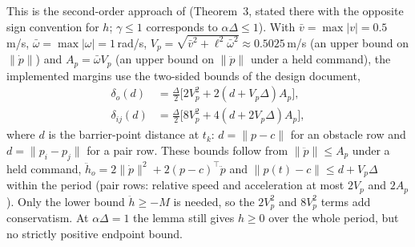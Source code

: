 \documentclass[journal]{IEEEtran}
\begin{document}
This is the second-order approach of \cite{breeden2022} (Theorem~3, stated there with the opposite
sign convention for $h$; $\gamma\le1$ corresponds to $\alpha\Delta\le1$). With
$\bar v=\max|v|=0.5$\,m/s, $\bar\omega=\max|\omega|=1$\,rad/s,
$V_p=\sqrt{\bar v^2+\ell^2\bar\omega^2}\approx0.5025$\,m/s (an upper bound on $\|\dot p\|$) and $A_p=\bar\omega V_p$ (an upper bound on $\|\ddot p\|$ under a held command), the implemented margins use the
two-sided bounds of the design document,
\begin{equation}
\begin{aligned}
\delta_o(d)&=\tfrac{\Delta}{2}\big[2V_p^2+2(d+V_p\Delta)A_p\big],\\
\delta_{ij}(d)&=\tfrac{\Delta}{2}\big[8V_p^2+4(d+2V_p\Delta)A_p\big],
\end{aligned}
\end{equation}
where $d$ is the barrier-point distance at $t_k$: $d=\|p-c\|$ for an obstacle row and
$d=\|p_i-p_j\|$ for a pair row. These bounds follow from $\|\ddot p\|\le A_p$ under a held command,
$\ddot h_o=2\|\dot p\|^2+2(p-c)^\top\ddot p$ and $\|p(t)-c\|\le d+V_p\Delta$ within the period (pair
rows: relative speed and acceleration at most $2V_p$ and $2A_p$). Only the lower bound $\ddot h\ge-M$
is needed, so the $2V_p^2$ and $8V_p^2$ terms add conservatism. At $\alpha\Delta=1$ the lemma still gives
$h\ge0$ over the whole period, but no strictly positive endpoint bound.
\end{document}
